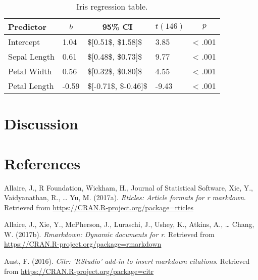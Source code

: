 \documentclass[man]{apa6}
\theoremstyle{definition}
\theoremstyle{definition}
\theoremstyle{definition}
\theoremstyle{remark}
\begin{document}
\begin{table}[tbp]
\begin{center}
\begin{threeparttable}
\caption{\label{tab:unnamed-chunk-2}Iris regression table.}
\begin{tabular}{lllll}
\toprule
Predictor & \multicolumn{1}{c}{$b$} & \multicolumn{1}{c}{95\% CI} & \multicolumn{1}{c}{$t(146)$} & \multicolumn{1}{c}{$p$}\\
\midrule
Intercept & 1.04 & \$[0.51\$, \$1.58]\$ & 3.85 & < .001\\
Sepal Length & 0.61 & \$[0.48\$, \$0.73]\$ & 9.77 & < .001\\
Petal Width & 0.56 & \$[0.32\$, \$0.80]\$ & 4.55 & < .001\\
Petal Length & -0.59 & \$[-0.71\$, \$-0.46]\$ & -9.43 & < .001\\
\bottomrule
\end{tabular}
\end{threeparttable}
\end{center}
\end{table}

\section{Discussion}\label{discussion}

\newpage

\section{References}\label{references}

\setlength{\parindent}{-0.5in} \setlength{\leftskip}{0.5in}

\hypertarget{refs}{}
\hypertarget{ref-R-rticles}{}
Allaire, J., R Foundation, Wickham, H., Journal of Statistical Software,
Xie, Y., Vaidyanathan, R., \ldots{} Yu, M. (2017a). \emph{Rticles:
Article formats for r markdown}. Retrieved from
\url{https://CRAN.R-project.org/package=rticles}

\hypertarget{ref-R-rmarkdown}{}
Allaire, J., Xie, Y., McPherson, J., Luraschi, J., Ushey, K., Atkins,
A., \ldots{} Chang, W. (2017b). \emph{Rmarkdown: Dynamic documents for
r}. Retrieved from \url{https://CRAN.R-project.org/package=rmarkdown}

\hypertarget{ref-R-citr}{}
Aust, F. (2016). \emph{Citr: 'RStudio' add-in to insert markdown
citations}. Retrieved from \url{https://CRAN.R-project.org/package=citr}
\end{document}
